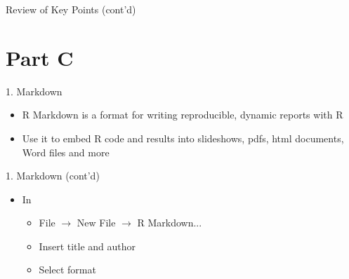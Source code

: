 \documentclass[14pt, aspectratio=169, sectionpage=simple, xclolor=table]{beamer}
\begin{document}
  \begin{frame}[fragile]{Review of Key Points (cont'd)}
\end{frame}
\section{Part C}

\begin{frame}[fragile]{1. Markdown}
\begin{itemize}
\item R Markdown is a format for writing \alert{reproducible, dynamic reports} with R
\item Use it to \alert{embed R code and results} into slideshows, pdfs, html documents, Word files and more
\end{itemize}
\end{frame}
\begin{frame}[fragile]{1. Markdown (cont'd)}
\begin{itemize}
\item In 
\vspace{1ex}
\vspace{1ex}
\begin{itemize}
\item File $\rightarrow$ New File $\rightarrow$ R Markdown...
\item Insert title and author
\item Select format
\end{itemize}
\end{itemize}
\end{frame}
\end{document}
